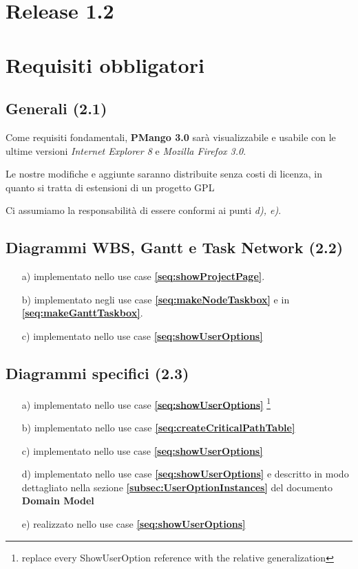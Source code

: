 \chapter*{Release \textbf{1.2}}

\chapter{Requisiti obbligatori}

\section{Generali (2.1)}
Come requisiti fondamentali, \textbf{PMango 3.0} sar\`a visualizzabile e
usabile con le ultime versioni \emph{Internet Explorer 8} e \emph{Mozilla
Firefox 3.0}.

Le nostre modifiche e aggiunte saranno distribuite senza costi di licenza, in
quanto si tratta di estensioni di un progetto GPL

Ci assumiamo la responsabilit\`a di essere conformi ai punti \emph{d), e)}.

\section{Diagrammi WBS, Gantt e Task Network (2.2)}
\begin{itemize}
  \item[a)] implementato nello use case \textbf{\ref{seq:showProjectPage}}.
  \item[b)] implementato negli use case \textbf{\ref{seq:makeNodeTaskbox}} e in
  \textbf{\ref{seq:makeGanttTaskbox}}.
  \item[c)] implementato nello use case \textbf{\ref{seq:showUserOptions}}
\end{itemize}

\section{Diagrammi specifici (2.3)}
\begin{itemize}
  \item[a)] implementato nello use case \textbf{\ref{seq:showUserOptions}}
  \footnote{replace every ShowUserOption reference with the relative
  generalization}
  \item[b)] implementato nello use case
  \textbf{\ref{seq:createCriticalPathTable}}
  \item[c)] implementato nello use case \textbf{\ref{seq:showUserOptions}}
  \item[d)] implementato nello use case \textbf{\ref{seq:showUserOptions}} e
  descritto in modo dettagliato nella sezione
  \textbf{\ref{subsec:UserOptionInstances}} del documento
  \textbf{Domain Model}
  \item[e)] realizzato nello use case \textbf{\ref{seq:showUserOptions}}
\end{itemize}

